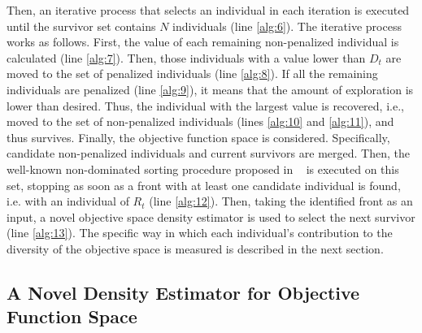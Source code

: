 Then, an iterative process that selects an individual in each iteration is executed until the survivor
set contains $N$ individuals (line \ref{alg:6}).
%
The iterative process works as follows.
%
First, the \DCS{} value of each remaining non-penalized individual is calculated (line \ref{alg:7}).
%
Then, those individuals with a \DCS{} value lower than $D_t$ are moved to the set of penalized individuals (line \ref{alg:8}).
%
If all the remaining individuals are penalized (line \ref{alg:9}), it means that the amount of exploration is lower than desired.
%
Thus, the individual with the largest \DCS{} value is recovered, i.e., moved to the set of non-penalized individuals (lines \ref{alg:10} and \ref{alg:11}), and thus survives.
%
Finally, the objective function space is considered.
%
Specifically, candidate non-penalized individuals and current survivors are merged.
%
Then, the well-known non-dominated sorting procedure proposed in ~\cite{Joel:NSGAII} 
is executed on this set, stopping as soon as a front with 
at least one candidate individual is found, i.e. with an individual of $R_t$ (line \ref{alg:12}).
%
Then, taking the identified front as an input, a novel objective space density estimator is used to select
the next survivor (line \ref{alg:13}).
%
The specific way in which each individual's contribution to the diversity of the objective space is measured is described in the next section.
%

\subsection{A Novel Density Estimator for Objective Function Space}
\label{subsection:density}


